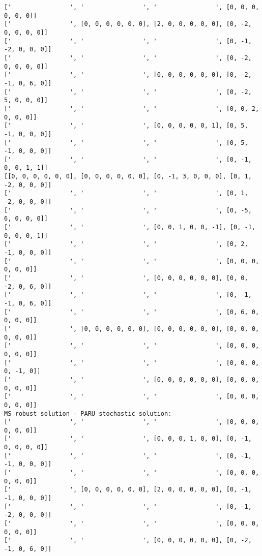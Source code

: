 \documentclass[10pt]{article}
\theoremstyle{plain}
\theoremstyle{definition}
\theoremstyle{remark}
\begin{document}
\begin{minipage}[t]{9cm}
\begin{verbatim}
['                ', '                ', '                ', [0, 0, 0, 0, 0, 0]]
['                ', [0, 0, 0, 0, 0, 0], [2, 0, 0, 0, 0, 0], [0, -2, 0, 0, 0, 0]]
['                ', '                ', '                ', [0, -1, -2, 0, 0, 0]]
['                ', '                ', '                ', [0, -2, 0, 0, 0, 0]]
['                ', '                ', [0, 0, 0, 0, 0, 0], [0, -2, -1, 0, 6, 0]]
['                ', '                ', '                ', [0, -2, 5, 0, 0, 0]]
['                ', '                ', '                ', [0, 0, 2, 0, 0, 0]]
['                ', '                ', [0, 0, 0, 0, 0, 1], [0, 5, -1, 0, 0, 0]]
['                ', '                ', '                ', [0, 5, -1, 0, 0, 0]]
['                ', '                ', '                ', [0, -1, 0, 0, 1, 1]]
[[0, 0, 0, 0, 0, 0], [0, 0, 0, 0, 0, 0], [0, -1, 3, 0, 0, 0], [0, 1, -2, 0, 0, 0]]
['                ', '                ', '                ', [0, 1, -2, 0, 0, 0]]
['                ', '                ', '                ', [0, -5, 6, 0, 0, 0]]
['                ', '                ', [0, 0, 1, 0, 0, -1], [0, -1, 0, 0, 0, 1]]
['                ', '                ', '                ', [0, 2, -1, 0, 0, 0]]
['                ', '                ', '                ', [0, 0, 0, 0, 0, 0]]
['                ', '                ', [0, 0, 0, 0, 0, 0], [0, 0, -2, 0, 6, 0]]
['                ', '                ', '                ', [0, -1, -1, 0, 6, 0]]
['                ', '                ', '                ', [0, 6, 0, 0, 0, 0]]
['                ', [0, 0, 0, 0, 0, 0], [0, 0, 0, 0, 0, 0], [0, 0, 0, 0, 0, 0]]
['                ', '                ', '                ', [0, 0, 0, 0, 0, 0]]
['                ', '                ', '                ', [0, 0, 0, 0, -1, 0]]
['                ', '                ', [0, 0, 0, 0, 0, 0], [0, 0, 0, 0, 0, 0]]
['                ', '                ', '                ', [0, 0, 0, 0, 0, 0]]
MS robust solution - PARU stochastic solution:
['                ', '                ', '                ', [0, 0, 0, 0, 0, 0]]
['                ', '                ', [0, 0, 0, 1, 0, 0], [0, -1, 0, 0, 0, 0]]
['                ', '                ', '                ', [0, -1, -1, 0, 0, 0]]
['                ', '                ', '                ', [0, 0, 0, 0, 0, 0]]
['                ', [0, 0, 0, 0, 0, 0], [2, 0, 0, 0, 0, 0], [0, -1, -1, 0, 0, 0]]
['                ', '                ', '                ', [0, -1, -2, 0, 0, 0]]
['                ', '                ', '                ', [0, 0, 0, 0, 0, 0]]
['                ', '                ', [0, 0, 0, 0, 0, 0], [0, -2, -1, 0, 6, 0]]

\end{verbatim}
\end{minipage}
\end{document}
